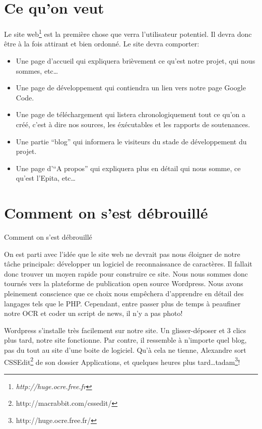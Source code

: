 \documentclass[]{report}
\begin{document}
		\section{Ce qu'on veut} %
		\label{sec:ce_qu_on_veut}
		Le site web\footnote{\emph{http://huge.ocre.free.fr}} est la premi\`ere chose que verra l'utilisateur potentiel. Il devra donc \^etre \`a la fois attirant et bien ordonn\'e. Le site devra comporter:
		\begin{itemize}
			\item Une page d'accueil qui expliquera bri\`evement ce qu'est notre projet, qui nous sommes, etc\ldots
			\item Une page de d\'eveloppement qui contiendra un lien vers notre page Google Code.
			\item Une page de t\'el\'echargement qui listera chronologiquement tout ce qu'on a cr\'e\'e, c'est \`a dire nos sources, les \'ex\'ecutables et les rapports de soutenances.
			\item Une partie ``blog'' qui informera le visiteurs du stade de d\'eveloppement du projet.
			\item Une page d'``A propos'' qui expliquera plus en d\'etail qui nous somme, ce qu'est l'Epita, etc\ldots
		\end{itemize} 
		\section{Comment on s'est d\'ebrouill\'e} %
		\label{sec:comment_on_s_est_d'ebrouill'e}
		Comment on s'est débrouillé

			On est parti avec l'idée que le site web ne devrait pas nous éloigner de notre tâche principale: développer un logiciel de reconnaissance de caractères. Il fallait donc trouver un moyen rapide pour construire ce site. Nous nous sommes donc tournés vers la plateforme de publication open source Wordpress.
			Nous avons pleinement conscience que ce choix nous empêchera d'apprendre en détail des langages tels que le PHP. Cependant, entre passer plus de temps à peaufiner notre OCR et coder un script de news, il n'y a pas photo!

			Wordpress s'installe très facilement sur notre site. Un glisser-déposer et 3 clics plus tard, notre site fonctionne. Par contre, il ressemble à n'importe quel blog, pas du tout au site d'une boite de logiciel. Qu'à cela ne tienne, Alexandre sort CSSEdit\footnote{http://macrabbit.com/cssedit/} de son dossier Applications, et quelques heures plus tard\ldots tadam\footnote{http://huge.ocre.free.fr/}!
\end{document}

